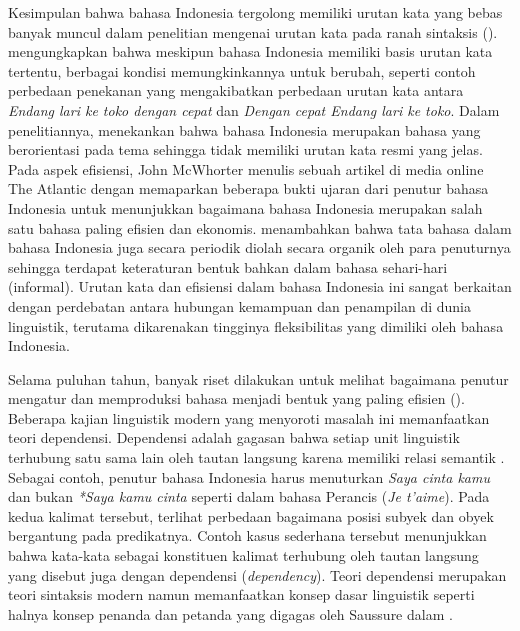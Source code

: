 Kesimpulan bahwa bahasa Indonesia tergolong memiliki urutan kata yang bebas banyak muncul dalam penelitian mengenai urutan kata pada ranah sintaksis (\citealp{stack2005word, postman2004processing}). \cite{sneddon2010indonesian} mengungkapkan bahwa meskipun bahasa Indonesia memiliki basis urutan kata tertentu, berbagai kondisi memungkinkannya untuk berubah, seperti contoh perbedaan penekanan yang mengakibatkan perbedaan urutan kata antara \textit{Endang lari ke toko dengan cepat} dan \textit{Dengan cepat Endang lari ke toko}. Dalam penelitiannya, \cite{postman2004processing} menekankan bahwa bahasa Indonesia merupakan bahasa yang berorientasi pada tema sehingga tidak memiliki urutan kata resmi yang jelas. Pada aspek efisiensi, John McWhorter menulis sebuah artikel di media online The Atlantic \citep{mcwhorter2016efficient} dengan memaparkan beberapa bukti ujaran dari penutur bahasa Indonesia untuk menunjukkan bagaimana bahasa Indonesia merupakan salah satu bahasa paling efisien dan ekonomis. \cite{mcwhorter2016efficient} menambahkan bahwa tata bahasa dalam bahasa Indonesia juga secara periodik diolah secara organik oleh para penuturnya sehingga terdapat keteraturan bentuk bahkan dalam bahasa sehari-hari (informal). Urutan kata dan efisiensi dalam bahasa Indonesia ini sangat berkaitan dengan perdebatan antara hubungan kemampuan dan penampilan di dunia linguistik, terutama dikarenakan tingginya fleksibilitas yang dimiliki oleh bahasa Indonesia.

Selama puluhan tahun, banyak riset dilakukan untuk melihat bagaimana penutur mengatur dan memproduksi bahasa menjadi bentuk yang paling efisien (\citealp{chomsky2005three, hawkins2004efficiency, zipf1935psycho, zipf1949human}). Beberapa kajian linguistik modern yang menyoroti masalah ini memanfaatkan teori dependensi. Dependensi adalah gagasan bahwa setiap unit linguistik terhubung satu sama lain oleh tautan langsung karena memiliki relasi semantik \citep{tesniere1959elements}. Sebagai contoh, penutur bahasa Indonesia harus menuturkan \textit{Saya cinta kamu} dan bukan \textit{*Saya kamu cinta} seperti dalam bahasa Perancis (\textit{Je t'aime}). Pada kedua kalimat tersebut, terlihat perbedaan bagaimana posisi subyek dan obyek bergantung pada predikatnya. Contoh kasus sederhana tersebut menunjukkan bahwa kata-kata sebagai konstituen kalimat terhubung oleh tautan langsung yang disebut juga dengan dependensi (\textit{dependency}). Teori dependensi merupakan teori sintaksis modern namun memanfaatkan konsep dasar linguistik seperti halnya konsep penanda dan petanda yang digagas oleh Saussure dalam \cite{key2017course}. 

